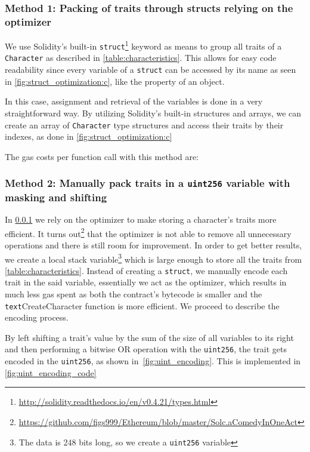 \subsubsection{Method 1: Packing of traits through structs relying on the optimizer} \label{method1}
We use Solidity's built-in \texttt{struct}\footnote{\url{http://solidity.readthedocs.io/en/v0.4.21/types.html}} keyword as means to group all traits of a \texttt{Character} as described in \ref{table:characteristics}. This allows for easy code readability since every variable of a \texttt{struct} can be accessed by its name as seen in \ref{fig:struct_optimization:c}, like the property of an object. 

In this case, assignment and retrieval of the variables is done in a very straightforward way. By utilizing Solidity's built-in structures and arrays, we can create an array of \texttt{Character} type structures and access their traits by their indexes, as done in \ref{fig:struct_optimization:c}

The gas costs per function call with this method are: 


\subsubsection{Method 2: Manually pack traits in a \texttt{uint256} variable with masking and shifting} \label{method2}
    
In \ref{method1} we rely on the optimizer to make storing a character's traits more efficient. It turns out\footnote{\url{https://github.com/figs999/Ethereum/blob/master/Solc.aComedyInOneAct}} that the optimizer is not able to remove all unnecessary operations and there is still room for improvement. In order to get better results, we create a local stack variable\footnote{The data is 248 bits long, so we create a \texttt{uint256} variable} which is large enough to store all the traits from \ref{table:characteristics}. Instead of creating a \texttt{struct}, we manually encode each trait in the said variable, essentially we act as the optimizer, which results in much less gas spent as both the contract's bytecode is smaller and the \texttt{text}{CreateCharacter} function is more efficient. We proceed to describe the encoding process.

By left shifting a trait's value by the sum of the size of all variables to its right and then performing a bitwise OR operation with the \texttt{uint256}, the trait gets encoded in the \texttt{uint256}, as shown in~\ref{fig:uint_encoding}. This is implemented in \ref{fig:uint_encoding_code}

